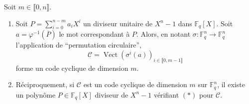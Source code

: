   \begin{theorem}
    Soit $m \in \llbracket 0, n \rrbracket$.
    \begin{enumerate}[label={\bfseries(\roman*)}]
      \item Soit $P = \sum_{i=0}^{n-m} a_i X^i$ un diviseur unitaire de $X^n - 1$ dans $\mathbb{F}_q[X]$. Soit $a = \varphi^{-1}(\overline{P})$ le mot correspondant à $P$. Alors, en notant $\sigma : \mathbb{F}_q^n \rightarrow \mathbb{F}_q^n$ l'application de ``permutation circulaire'',
      \[ \mathcal{C} = \operatorname{Vect}(\sigma^{i}(a))_{i \in \llbracket 0, m-1 \rrbracket} \tag{$*$} \]
      forme un code cyclique de dimension $m$.
      \item Réciproquement, si $\mathcal{C}$ est un code cyclique de dimension $m$ sur $\mathbb{F}_q^n$, il existe un polynôme $P \in \mathbb{F}_q[X]$ diviseur de $X^n - 1$ vérifiant $(*)$ pour $\mathcal{C}$.
    \end{enumerate}
  \end{theorem}

